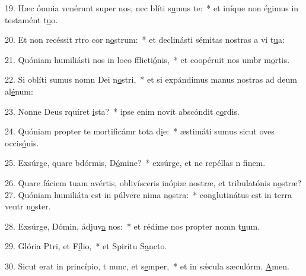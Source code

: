 19. Hæc ómnia venérunt super nos, nec blíti s\uline{u}mus te:~* et iníque non égimus in testamént t\uline{u}o.\par 
20. Et non recéssit rtro cor n\uline{o}strum:~* et declinásti sémitas nostras a vi t\uline{u}a:\par 
21. Quóniam humiliásti nos in loco fflicti\uline{ó}nis,~* et coopéruit nos umbr m\uline{o}rtis.\par 
22. Si oblíti sumus nomn Dei n\uline{o}stri,~* et si expándimus manus nostras ad deum al\uline{é}num:\par 
23. Nonne Deus rquíret \uline{i}sta?~* ipse enim novit abscóndit c\uline{o}rdis.\par 
24. Quóniam propter te mortificámr tota d\uline{i}e:~* æstimáti sumus sicut oves occis\uline{ó}nis.\par 
25. Exsúrge, quare bdórmis, D\uline{ó}mine?~* exsúrge, et ne repéllas n f\uline{i}nem.\par 
26. Quare fáciem tuam avértis, oblivísceris inópiæ nostræ, et tribulatónis n\uline{o}stræ?
27. Quóniam humiliáta est in púlvere nima n\uline{o}stra:~* conglutinátus est in terra ventr n\uline{o}ster.\par 
28. Exsúrge, Dómin, ádjuv\uline{a} nos:~* et rédime nos propter nomn t\uline{u}um.\par 
29. Glória Ptri, et F\uline{í}lio,~* et Spirítu S\uline{a}ncto.\par 
30. Sicut erat in princípio, t nunc, et s\uline{e}mper,~* et in sǽcula sæculórm. \uline{A}men.\par 

